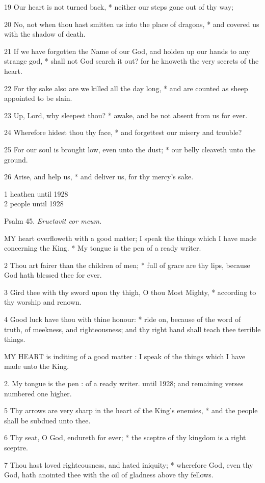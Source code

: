 19 Our heart is not turned back, * neither our steps
gone out of thy way;

20 No, not when thou hast smitten us into the place
of dragons, * and covered us with the shadow of death.

21 If we have forgotten the Name of our God, and holden
up our hands to any strange god, * shall not God search it out? for he
knoweth the very secrets of the heart.

22 For thy sake also are we killed all the day long,
* and are counted as sheep appointed to be slain.

23 Up, Lord, why sleepest thou? * awake, and be not
absent from us for ever.

24 Wherefore hidest thou thy face, * and forgettest
our misery and trouble?

25 For our soul is brought low, even unto the dust;
* our belly cleaveth unto the ground.

26 Arise, and help us, * and deliver us, for thy mercy's
sake.

1 heathen until
1928\\
2 people until
1928

Psalm
45. \emph{Eructavit cor meum.}

MY
heart overfloweth with a good matter; I speak the things which I have
made concerning the King. * My tongue is the pen of a ready writer.

2 Thou art fairer than the children of men; * full
of grace are thy lips, because God hath blessed thee for ever.

3 Gird thee with thy sword upon thy thigh, O thou Most
Mighty, * according to thy worship and renown.

4 Good luck have thou with thine honour: * ride on,
because of the word of truth, of meekness, and righteousness; and thy
right hand shall teach thee terrible things.

MY HEART is inditing of a good matter :
I speak of the things which I have made unto the King.

2. My tongue is the pen : of a ready writer. until
1928; and remaining verses numbered one higher.

5 Thy arrows are very sharp in the heart of the King's
enemies, * and the people shall be subdued unto thee.

6 Thy seat, O God, endureth for ever; * the sceptre of
thy kingdom is a right sceptre.

7 Thou hast loved righteousness, and hated iniquity;
* wherefore God, even thy God, hath anointed thee with the oil of gladness
above thy fellows.

